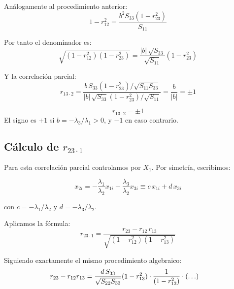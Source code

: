 \documentclass[12pt, letterpaper]{article}
\theoremstyle{remark}
\newcommand{\rp}[2]{r_{#1 \cdot #2}}   %
\begin{document}
Análogamente al procedimiento anterior:
\begin{equation}
  1 - r_{12}^2
    = \frac{b^2 S_{33}(1-r_{23}^2)}{S_{11}}
  \label{eq:1mr12}
\end{equation}

Por tanto el denominador es:
\begin{equation}
  \sqrt{(1-r_{12}^2)(1-r_{23}^2)}
    = \frac{|b|\,\sqrt{S_{33}}}{\sqrt{S_{11}}}(1-r_{23}^2)
  \label{eq:denom_r13_2}
\end{equation}

Y la correlación parcial:
\begin{equation}
  \rp{13}{2}
    = \frac{b\,S_{33}(1-r_{23}^2)/\sqrt{S_{11}S_{33}}}
           {|b|\,\sqrt{S_{33}}(1-r_{23}^2)/\sqrt{S_{11}}}
    = \frac{b}{|b|}
    = \pm 1
  \label{eq:r13_2_resultado}
\end{equation}

\begin{clave}
  \[\rp{13}{2} = \pm 1\]
  El signo es $+1$ si $b = -\lambda_3/\lambda_1 > 0$, y $-1$ en caso contrario.
\end{clave}

\subsection{Cálculo de \texorpdfstring{$\rp{23}{1}$}{r23.1}}

Para esta correlación parcial controlamos por $X_1$. Por simetría, escribimos:

\begin{equation}
  x_{2i} = -\frac{\lambda_1}{\lambda_2} x_{1i}
            -\frac{\lambda_3}{\lambda_2} x_{3i}
           \equiv c\, x_{1i} + d\, x_{3i}
  \label{eq:x2_desv}
\end{equation}

\noindent con $c = -\lambda_1/\lambda_2$ y $d = -\lambda_3/\lambda_2$.

Aplicamos la fórmula:
\begin{equation}
  \rp{23}{1}
    = \frac{r_{23} - r_{12}\,r_{13}}
           {\sqrt{(1-r_{12}^2)(1-r_{13}^2)}}
  \label{eq:r23_1_formula}
\end{equation}

Siguiendo exactamente el mismo procedimiento algebraico:
\begin{align}
  r_{23} - r_{12}r_{13}
  &= \frac{d\,S_{33}}{\sqrt{S_{22}S_{33}}}(1-r_{13}^2) \cdot
     \frac{1}{(1-r_{13}^2)} \cdot (\ldots)
  \notag
\end{align}
\end{document}
